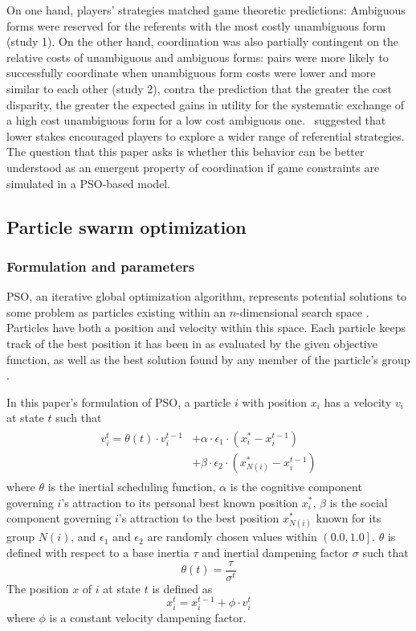 \documentclass[a4paper,11pt]{article}
\begin{document}
On one hand, players' strategies matched game theoretic predictions: Ambiguous forms were reserved for the referents with the most costly unambiguous form (study 1).  On the other hand, coordination was also partially contingent on the relative costs of unambiguous and ambiguous forms: pairs were more likely to successfully coordinate when unambiguous form costs were lower and more similar to each other (study 2), contra the prediction that the greater the cost disparity, the greater the expected gains in utility for the systematic exchange of a high cost unambiguous form for a low cost ambiguous one. \citeauthor{rohde2012}\ suggested that lower stakes encouraged players to explore a wider range of referential strategies. The question that this paper asks is whether this behavior can be better understood as an emergent property of coordination if game constraints are simulated in a PSO-based model.


\subsection{Particle swarm optimization}
\subsubsection{Formulation and parameters}
\label{sec:2.2.3}
PSO, an iterative global optimization algorithm, represents potential solutions to some problem as particles existing within an $n$-dimensional search space \cite{kennedy1995}. Particles have both a position and velocity within this space. Each particle keeps track of the best position it has been in as evaluated by the given objective function, as well as the best solution found by any member of the particle's group \cite{chong2013}. 

In this paper's formulation of PSO, a particle $i$ with position $x_i$ has a velocity $v_i$ at state $t$ such that 
\begin{multline} \label{eq:pso_vel}
\begin{split}
v_i^t = \theta(t) \cdot v_i^{t-1} & + \alpha \cdot \epsilon_1 \cdot (x_i^* - x_i^{t-1}) \\
                                  & + \beta \cdot \epsilon_2 \cdot (x_{N(i)}^* - x_i^{t-1})
\end{split}
\end{multline}
where $\theta$ is the inertial scheduling function, $\alpha$ is the cognitive component governing $i$'s attraction to its personal best known position $x_i^*$, $\beta$ is the social component governing $i$'s attraction to the best position $x_{N(i)}^*$ known for its group $N(i)$, and $\epsilon_1$ and $\epsilon_2$ are randomly chosen values within $\left(0.0, 1.0\right]$. $\theta$ is defined with respect to a base inertia $\tau$ and inertial dampening factor $\sigma$ such that
\begin{equation}
\theta(t) = \frac{\tau}{\sigma^t} 
\end{equation}
The position $x$ of $i$ at state $t$ is defined as
\begin{equation}
x_i^t = x_i^{t-1} + \phi \cdot v_i^t 
\end{equation}
where $\phi$ is a constant velocity dampening factor.
\end{document}
